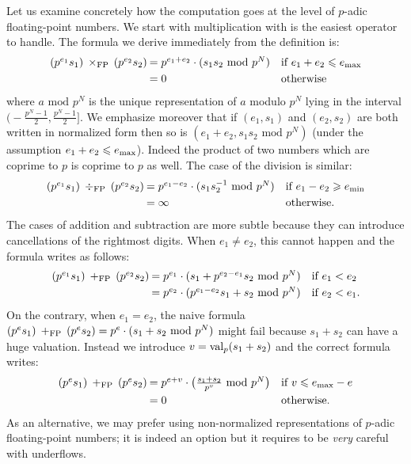 \documentclass[11pt]{article}
\numberwithin{equation}{section}
\numberwithin{figure}{section}
\renewcommand{\leq}{\leqslant}
\renewcommand{\geq}{\geqslant}
\theoremstyle{definition}
\renewcommand{\min}{\text{\rm min}}
\renewcommand{\max}{\text{\rm max}}
\newcommand{\val}{\text{\rm val}}
\newcommand{\FP}{\text{\rm FP}}
\begin{document}
Let us examine concretely how the computation goes at the level of
$p$-adic floating-point numbers. We start with multiplication with
is the easiest operator to handle. The formula we derive immediately
from the definition is:
$$\begin{array}{r@{\hspace{0.5ex}}ll}
(p^{e_1} s_1) \: \times_\FP \: (p^{e_2} s_2)
  & = p^{e_1 + e_2} \cdot (s_1 s_2 \text{ mod } p^N)
  & \text{if } e_1 + e_2 \leq e_\max \smallskip \\
  & = 0
  & \text{otherwise}
\end{array}$$
where $a \text{ mod } p^N$ is the unique representation of $a$ modulo
$p^N$ lying in the interval $\big(\!-\frac{p^N-1} 2,  \frac{p^N-1} 2\big]$.
We emphasize moreover that if $(e_1, s_1)$ and $(e_2, s_2)$ are both
written in normalized form then so is $(e_1 + e_2, s_1 s_2 \text{ mod } p^N)$ (under the 
assumption $e_1 + e_2 \leq e_\max$). Indeed the product of two numbers
which are coprime to $p$ is coprime to $p$ as well.
The case of the division is similar:
$$\begin{array}{r@{\hspace{0.5ex}}ll}
(p^{e_1} s_1) \: \div_\FP \: (p^{e_2} s_2)
  & = p^{e_1 - e_2} \cdot (s_1 s_2^{-1} \text{ mod } p^N)
  & \text{if } e_1 - e_2 \geq e_\min \smallskip \\
  & = \infty
  & \text{otherwise.}
\end{array}$$
The cases of addition and subtraction are more subtle because they 
can introduce cancellations of the rightmost digits. When $e_1
\neq e_2$, this cannot happen and the formula writes as follows:
$$\begin{array}{r@{\hspace{0.5ex}}ll}
(p^{e_1} s_1) \: +_\FP \: (p^{e_2} s_2)
  & = p^{e_1} \cdot (s_1 + p^{e_2 - e_1} s_2 \text{ mod } p^N)
  & \text{if } e_1 < e_2 \smallskip \\
  & = p^{e_2} \cdot (p^{e_1-e_2} s_1 + s_2 \text{ mod } p^N)
  & \text{if } e_2 < e_1.
\end{array}$$
On the contrary, when $e_1 = e_2$, the naive formula
$(p^e s_1) \: +_\FP \: (p^e s_2)
  = p^e \cdot (s_1 + s_2 \text{ mod } p^N)$
might fail because $s_1 + s_2$ can have a huge valuation. Instead 
we introduce $v = \val_p(s_1 + s_2)$ and the correct formula writes:
$$\begin{array}{r@{\hspace{0.5ex}}ll}
(p^e s_1) \: +_\FP \: (p^e s_2)
  & = p^{e+v} \cdot \big(\frac{s_1 + s_2}{p^v} \text{ mod } p^N\big)
  & \text{if } v \leq e_\max - e \smallskip \\
  & = 0
  & \text{otherwise.}
\end{array}$$
As an alternative, we may prefer using non-normalized representations
of $p$-adic floating-point numbers; it is indeed an option but it
requires to be \emph{very} careful with underflows.
\end{document}
